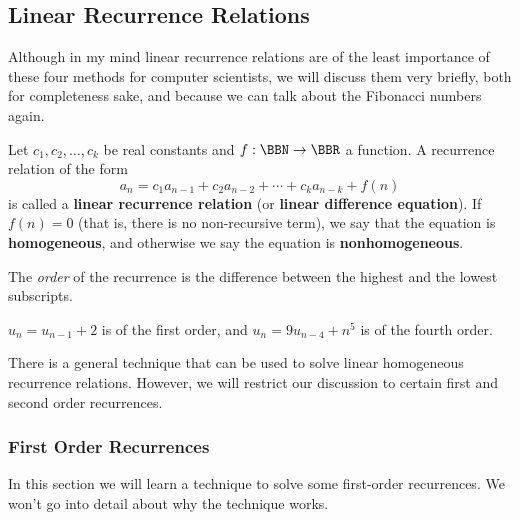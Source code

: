 \subsection{Linear Recurrence Relations}\label{subsec:linear}

Although in my mind linear recurrence relations are of the least importance of
these four methods for computer scientists, we will discuss them very briefly, both for
completeness sake, and because we can talk about the Fibonacci numbers again.


\begin{df}
Let $c_1, c_2, \ldots , c_k$ be real constants and $f:\BBN \to \BBR$
a function. A recurrence relation of the form 
\begin{equation}\label{eq:linRec}
a_{n} = c_{1}a_{n-1}+c_{2}a_{n-2}+\cdots+c_{k}a_{n-k}+f(n)
\end{equation}
is called a {\bf linear recurrence relation} (or {\bf linear difference equation}). 
If $f(n)=0$ (that is, there is no non-recursive term), 
we say that the equation is {\bf homogeneous}, and otherwise
we say the equation is {\bf nonhomogeneous}.
\end{df}

The {\em order} of the recurrence is  the difference between the
highest and the lowest subscripts. 
\begin{exa} $u_{n} = u_{n -1} + 2$ is of the first order, and
$u_{n} = 9u_{n-4} + n^5$ is of the fourth order.
\end{exa}

There is a general technique that can be used to solve linear homogeneous recurrence relations.
However, we will restrict our discussion to certain first and second order recurrences.

\subsubsection{First Order Recurrences}

In this section we will learn a technique to solve some first-order recurrences.
We won't go into detail about why the technique works.

